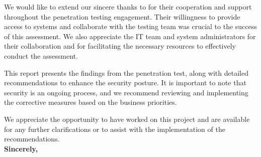 {
\qquad We would like to extend our sincere thanks to \enterpriseName for their cooperation and support throughout the penetration testing engagement. Their willingness to provide access to systems and collaborate with the testing team was crucial to the success of this assessment. We also appreciate the IT team and system administrators for their collaboration and for facilitating the necessary resources to effectively conduct the assessment.

This report presents the findings from the penetration test, along with detailed recommendations to enhance the security posture. It is important to note that security is an ongoing process, and we recommend reviewing and implementing the corrective measures based on the business priorities.

We appreciate the opportunity to have worked on this project and are available for any further clarifications or to assist with the implementation of the recommendations.
\\

\noindent \textbf{Sincerely,} \\
\brandName \\
\position \\
\myName  \\

}


